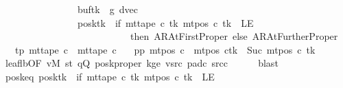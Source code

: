 \begin{isabellebody}
\ \ \ \ \ \ \ \ \ \ \ \ \ \ \ \ buf{\isacharparenleft}{\kern0pt}tk\ {\isacharcolon}{\kern0pt}{\isacharequal}{\kern0pt}\ {\isacharquery}{\kern0pt}g{}{\isacharparenright}{\kern0pt}{\isacharcomma}{\kern0pt}\ dvec{\isacharcomma}{\kern0pt}\isanewline
\ \ \ \ \ \ \ \ \ \ \ \ \ \ \ \ posk{\isacharparenleft}{\kern0pt}tk\ {\isacharcolon}{\kern0pt}{\isacharequal}{\kern0pt}\ if\ mt{\isacharunderscore}{\kern0pt}tape\ c{}\ tk\ {\isacharparenleft}{\kern0pt}mt{\isacharunderscore}{\kern0pt}pos\ c{}\ tk{\isacharparenright}{\kern0pt}\ {\isacharequal}{\kern0pt}\ LE{}\isanewline
\ \ \ \ \ \ \ \ \ \ \ \ \ \ \ \ \ \ \ \ \ \ \ \ \ \ \ then\ AR{\isacharunderscore}{\kern0pt}AtFirstProper\ else\ AR{\isacharunderscore}{\kern0pt}AtFurtherProper{\isacharparenright}{\kern0pt}{\isacharparenright}{\kern0pt}{\isachardoublequoteclose}\isanewline
\ \ \ tp{}{\isacharcolon}{\kern0pt}\ {\isachardoublequoteopen}mt{\isacharunderscore}{\kern0pt}tape\ c{}\ {\isacharequal}{\kern0pt}\ mt{\isacharunderscore}{\kern0pt}tape\ c{}{\isachardoublequoteclose}\isanewline
\ \ \ pp{}{\isacharcolon}{\kern0pt}\ {\isachardoublequoteopen}mt{\isacharunderscore}{\kern0pt}pos\ c{}\ {\isacharequal}{\kern0pt}\ {\isacharparenleft}{\kern0pt}mt{\isacharunderscore}{\kern0pt}pos\ c{}{\isacharparenright}{\kern0pt}{\isacharparenleft}{\kern0pt}tk\ {\isacharcolon}{\kern0pt}{\isacharequal}{\kern0pt}\ Suc\ {\isacharparenleft}{\kern0pt}mt{\isacharunderscore}{\kern0pt}pos\ c{}\ tk{\isacharparenright}{\kern0pt}{\isacharparenright}{\kern0pt}{\isachardoublequoteclose}\isanewline
\ \ \ \ \isamarkupfalse%
\ leaf{\isacharunderscore}{\kern0pt}lb{}{\isacharbrackleft}{\kern0pt}OF\ vM\ st{}\ qQ\ posk{\isacharunderscore}{\kern0pt}proper\ kge{}\ vsrc{}\ pad{\isacharunderscore}{\kern0pt}c{}\ src{\isacharunderscore}{\kern0pt}c{}{\isacharbrackright}{\kern0pt}\isanewline
\ \ \ \ \isamarkupfalse%
\ blast\isanewline
\ \ \isamarkupfalse%
\ posk{}{\isacharunderscore}{\kern0pt}eq{\isacharcolon}{\kern0pt}\ {\isachardoublequoteopen}posk{\isacharparenleft}{\kern0pt}tk\ {\isacharcolon}{\kern0pt}{\isacharequal}{\kern0pt}\ if\ mt{\isacharunderscore}{\kern0pt}tape\ c{}\ tk\ {\isacharparenleft}{\kern0pt}mt{\isacharunderscore}{\kern0pt}pos\ c{}\ tk{\isacharparenright}{\kern0pt}\ {\isacharequal}{\kern0pt}\ LE{}\isanewline

\end{isabellebody}
